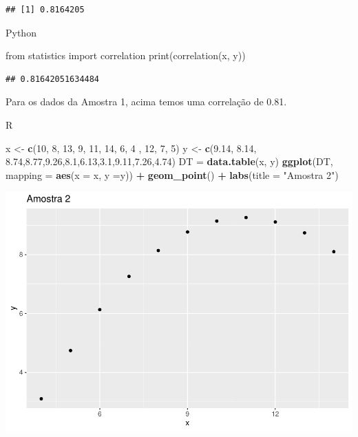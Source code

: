 \documentclass[
]{book}
\newenvironment{Shaded}{\begin{snugshade}}{\end{snugshade}}
\newcommand{\AttributeTok}[1]{\textcolor[rgb]{0.13,0.29,0.53}{#1}}
\newcommand{\BuiltInTok}[1]{#1}
\newcommand{\DecValTok}[1]{\textcolor[rgb]{0.00,0.00,0.81}{#1}}
\newcommand{\FloatTok}[1]{\textcolor[rgb]{0.00,0.00,0.81}{#1}}
\newcommand{\FunctionTok}[1]{\textcolor[rgb]{0.13,0.29,0.53}{\textbf{#1}}}
\newcommand{\ImportTok}[1]{#1}
\newcommand{\NormalTok}[1]{#1}
\newcommand{\OtherTok}[1]{\textcolor[rgb]{0.56,0.35,0.01}{#1}}
\newcommand{\SpecialCharTok}[1]{\textcolor[rgb]{0.81,0.36,0.00}{\textbf{#1}}}
\newcommand{\StringTok}[1]{\textcolor[rgb]{0.31,0.60,0.02}{#1}}
\begin{document}
\begin{verbatim}
## [1] 0.8164205
\end{verbatim}

Python

\begin{Shaded}
\begin{Highlighting}[]
\ImportTok{from}\NormalTok{ statistics }\ImportTok{import}\NormalTok{ correlation}
\BuiltInTok{print}\NormalTok{(correlation(x, y))}
\end{Highlighting}
\end{Shaded}

\begin{verbatim}
## 0.81642051634484
\end{verbatim}

Para os dados da Amostra 1, acima temos uma correlação de 0.81.

R

\begin{Shaded}
\begin{Highlighting}[]
\NormalTok{x }\OtherTok{\textless{}{-}} \FunctionTok{c}\NormalTok{(}\DecValTok{10}\NormalTok{, }\DecValTok{8}\NormalTok{, }\DecValTok{13}\NormalTok{, }\DecValTok{9}\NormalTok{, }\DecValTok{11}\NormalTok{, }\DecValTok{14}\NormalTok{, }\DecValTok{6}\NormalTok{, }\DecValTok{4}\NormalTok{ , }\DecValTok{12}\NormalTok{, }\DecValTok{7}\NormalTok{, }\DecValTok{5}\NormalTok{)}
\NormalTok{y }\OtherTok{\textless{}{-}} \FunctionTok{c}\NormalTok{(}\FloatTok{9.14}\NormalTok{, }\FloatTok{8.14}\NormalTok{, }\FloatTok{8.74}\NormalTok{,}\FloatTok{8.77}\NormalTok{,}\FloatTok{9.26}\NormalTok{,}\FloatTok{8.1}\NormalTok{,}\FloatTok{6.13}\NormalTok{,}\FloatTok{3.1}\NormalTok{,}\FloatTok{9.11}\NormalTok{,}\FloatTok{7.26}\NormalTok{,}\FloatTok{4.74}\NormalTok{)}
\NormalTok{DT }\OtherTok{=} \FunctionTok{data.table}\NormalTok{(x, y)}
\FunctionTok{ggplot}\NormalTok{(DT, }\AttributeTok{mapping =} \FunctionTok{aes}\NormalTok{(}\AttributeTok{x =}\NormalTok{ x, }\AttributeTok{y =}\NormalTok{y)) }\SpecialCharTok{+}
  \FunctionTok{geom\_point}\NormalTok{() }\SpecialCharTok{+}
  \FunctionTok{labs}\NormalTok{(}\AttributeTok{title =} \StringTok{"Amostra 2"}\NormalTok{)}
\end{Highlighting}
\end{Shaded}

\includegraphics{_main_files/figure-latex/unnamed-chunk-15-1.pdf}
\end{document}
